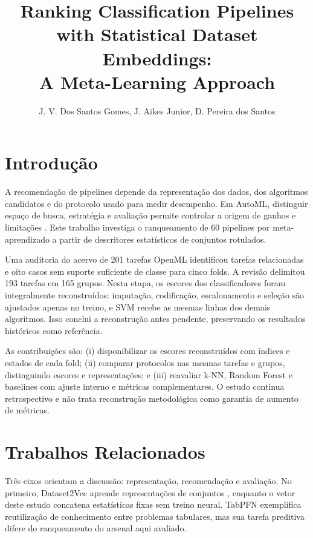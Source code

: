 \documentclass[kdmile,a4paper]{kdmile} %
\title{Ranking Classification Pipelines with Statistical Dataset Embeddings:\\ A Meta-Learning Approach}
\author{J. V. Dos Santos Gomes, J. Aikes Junior, D. Pereira dos Santos}
\institute{Universidade Tecnológica Federal do Paraná (UTFPR), Brazil \\
\email{joaogomes.2003@alunos.utfpr.edu.br, jorgejunior@utfpr.edu.br, davip@professores.utfpr.edu.br}
}
\begin{document}
\begin{bottomstuff}
\end{bottomstuff}

\maketitle

\section{Introdução}\label{sec:introduction}

A recomendação de pipelines depende da representação dos dados, dos algoritmos candidatos e do protocolo usado para medir desempenho. Em AutoML, distinguir espaço de busca, estratégia e avaliação permite controlar a origem de ganhos e limitações \cite{Baratchi2024}. Este trabalho investiga o ranqueamento de 60 pipelines por meta-aprendizado a partir de descritores estatísticos de conjuntos rotulados.

Uma auditoria do acervo de 201 tarefas OpenML identificou tarefas relacionadas e oito casos sem suporte suficiente de classe para cinco folds. A revisão delimitou 193 tarefas em 165 grupos. Nesta etapa, os escores dos classificadores foram integralmente reconstruídos: imputação, codificação, escalonamento e seleção são ajustados apenas no treino, e SVM recebe as mesmas linhas dos demais algoritmos. Isso conclui a reconstrução antes pendente, preservando os resultados históricos como referência.

As contribuições são: (i) disponibilizar os escores reconstruídos com índices e estados de cada fold; (ii) comparar protocolos nas mesmas tarefas e grupos, distinguindo escores e representações; e (iii) reavaliar k-NN, Random Forest e baselines com ajuste interno e métricas complementares. O estudo continua retrospectivo e não trata reconstrução metodológica como garantia de aumento de métricas.

\section{Trabalhos Relacionados}

Três eixos orientam a discussão: representação, recomendação e avaliação. No primeiro, Dataset2Vec aprende representações de conjuntos \cite{Jomaa2021}, enquanto o vetor deste estudo concatena estatísticas fixas sem treino neural. TabPFN \cite{Hollmann2025} exemplifica reutilização de conhecimento entre problemas tabulares, mas sua tarefa preditiva difere do ranqueamento do arsenal aqui avaliado.
\end{document}
